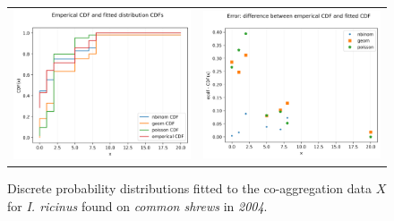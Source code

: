 \documentclass{article}
\begin{document}
\begin{figure}[h!]
	\centering
	\begin{tabular}{ll}
		\includegraphics[width=.48\linewidth,valign=m]{CDF_compare_2004_I.ricinus_SA} & \includegraphics[width=.48\linewidth,valign=m]{CDF_errors_2004_I.ricinus_SA}
	\end{tabular}
	\caption{Discrete probability distributions fitted to the co-aggregation data $ X $ for \textit{I. ricinus} found on \textit{common shrews} in \textit{2004}.}
	\label{fig:kielder_2004_iricinus_SA}
\end{figure}
\end{document}
